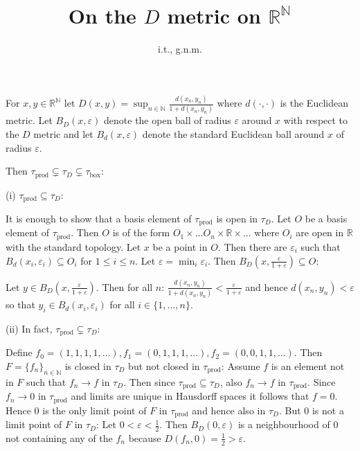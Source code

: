 \documentclass{article}
\begin{document}
\title{On the $D$ metric on $\mathbb R^{\mathbb N}$}
\author{i.t., g.n.m.}
\maketitle

\setlength{\parindent}{0cm} 

For $x,y \in \mathbb R^{\mathbb N}$ let $D(x,y) = \sup_{n \in \mathbb N} \frac{d(x_n,y_n)}{1 + d(x_n,y_n)}$ where $d(\cdot, \cdot)$ is the Euclidean metric. Let $B_D(x, \varepsilon)$ denote the open ball of radius $\varepsilon$ around $x$ with respect to the $D$ metric and let $B_d(x,\varepsilon)$ denote the standard Euclidean ball around $x$ of radius $\varepsilon$.
\vspace{0.5cm}

Then $\tau_{\text{prod}} \subsetneq \tau_D \subsetneq \tau_{\text{box}}$:
\vspace{0.5cm}

(i) $\tau_{\text{prod}} \subseteq \tau_D$: 
\vspace{0.5cm}

It is enough to show that a basis element of $\tau_{\text{prod}}$ is open in $\tau_D$. Let $O$ be a basis element of $\tau_{\text{prod}}$. Then $O$ is of the form $O_1 \times \dots O_n \times \mathbb R \times \dots$ where $O_i$ are open in $\mathbb R$ with the standard topology. Let $x$ be a point in $O$. Then there are $\varepsilon_i$ such that $B_d (x_i, \varepsilon_i) \subseteq O_i$ for $1 \le i \le n$. Let $\varepsilon = \min_i \varepsilon_i$. Then $B_D (x, \frac{\varepsilon}{ 1 + \varepsilon}) \subseteq O$:

Let $y \in B_D (x, \frac{\varepsilon}{ 1 + \varepsilon}) $. Then for all $n$: $\frac{d(x_n, y_n)}{ 1 + d(x_n , y_n)} < \frac{\varepsilon}{1 + \varepsilon}$ and hence $d(x_n,y_n) < \varepsilon$ so that $y_i \in B_d(x_i, \varepsilon_i)$ for all $i \in \{1, \dots , n \}$. 
\vspace{0.5cm}


(ii) In fact, $\tau_{\text{prod}} \subsetneq \tau_D$:
\vspace{0.5cm}

Define $f_0 = (1,1,1,1, \dots ), f_1 = (0,1,1,1, \dots), f_2 = (0,0,1,1,\dots)$. Then $F= \{f_n\}_{n \in \mathbb N}$ is closed in $\tau_D$ but not closed in $\tau_{\text{prod}} $: Assume $f$ is an element not in $F$ such that $f_n \to f$ in $\tau_D$. Then since $\tau_{\text{prod}} \subseteq \tau_D$, also $f_n \to f$ in $\tau_{\text{prod}} $. Since $f_n \to 0$ in $\tau_{\text{prod}} $ and limits are unique in Hausdorff spaces it follows that $f=0$. Hence $0$ is the only limit point of $F$ in $\tau_{\text{prod}} $ and hence also in $\tau_D$. But $0$ is not a limit point of $F$ in $\tau_D$: Let $0 < \varepsilon < \frac12$. Then $B_D(0,\varepsilon)$ is a neighbourhood of $0$ not containing any of the $f_n$ because $D(f_n, 0) = \frac12 > \varepsilon$. 
\vspace{0.5cm}
\end{document}
